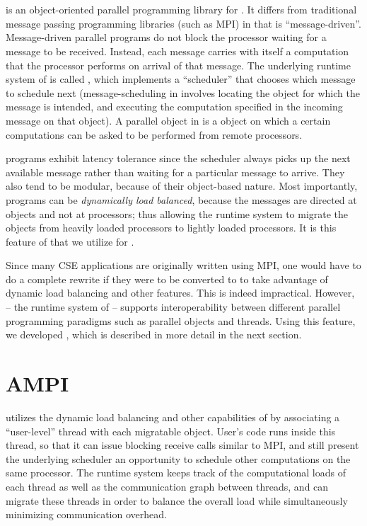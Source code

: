 \documentclass[10pt]{article}
\begin{document}
\section{\charmpp{}}

\charmpp{} is an object-oriented parallel programming library for \CC{}.  It
differs from traditional message passing programming libraries (such as MPI) in
that \charmpp{} is ``message-driven''. Message-driven parallel programs do not
block the processor waiting for a message to be received.  Instead, each
message carries with itself a computation that the processor performs on
arrival of that message. The underlying runtime system of \charmpp{} is called
\converse{}, which implements a ``scheduler'' that chooses which message to
schedule next (message-scheduling in \charmpp{} involves locating the object
for which the message is intended, and executing the computation specified in
the incoming message on that object). A parallel object in \charmpp{} is a
\CC{} object on which a certain computations can be asked to be performed from
remote processors.

\charmpp{} programs exhibit latency tolerance since the scheduler always picks
up the next available message rather than waiting for a particular message to
arrive.  They also tend to be modular, because of their object-based nature.
Most importantly, \charmpp{} programs can be \emph{dynamically load balanced},
because the messages are directed at objects and not at processors; thus
allowing the runtime system to migrate the objects from heavily loaded
processors to lightly loaded processors. It is this feature of \charmpp{} that
we utilize for \ampi{}.

Since many CSE applications are originally written using MPI, one would have to
do a complete rewrite if they were to be converted to \charmpp{} to take
advantage of dynamic load balancing and other \charmpp{} features. This is
indeed impractical. However, \converse{} -- the runtime system of \charmpp{} --
supports interoperability between different parallel programming paradigms
such as parallel objects and threads. Using this feature, we developed
\ampi{}, which is described in more detail in the next section.

\section{AMPI}

\ampi{} utilizes the dynamic load balancing and other capabilities of \charmpp{} by
associating a ``user-level'' thread with each \charmpp{} migratable object.
User's code runs inside this thread, so that it can issue blocking receive
calls similar to MPI, and still present the underlying scheduler an opportunity
to schedule other computations on the same processor. The runtime system keeps
track of the computational loads of each thread as well as the communication graph
between \ampi{} threads, and can migrate these threads in order to balance the
overall load while simultaneously minimizing communication overhead.
\end{document}
